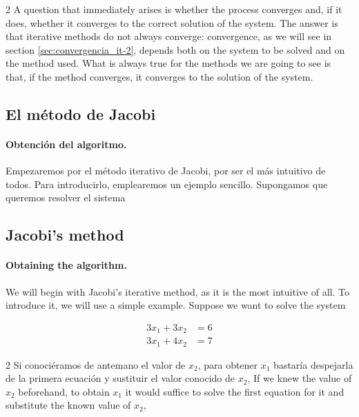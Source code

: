 \begin{paracol}{2}
A question that immediately arises is whether the process converges and, if it does, whether it converges to the correct solution of the system. The answer is that iterative methods do not always converge: convergence, as we will see in section \ref{sec:convergencia_it-2}, depends both on the system to be solved and on the method used. What is always true for the methods we are going to see is that, if the method converges, it converges to the solution of the system.

\switchcolumn
\subsection{El método de Jacobi} 

\paragraph{Obtención del algoritmo.} Empezaremos por el método iterativo de Jacobi, por ser el más intuitivo de todos. Para introducirlo, emplearemos un ejemplo sencillo. Supongamos que queremos resolver el sistema

\switchcolumn
\subsection{Jacobi's method} 

\paragraph{Obtaining the algorithm.} We will begin with Jacobi's iterative method, as it is the most intuitive of all. To introduce it, we will use a simple example. Suppose we want to solve the system
\end{paracol}

\begin{align*}
3x_1+3x_2&=6\\
3x_1+4x_2&=7
\end{align*}

\begin{paracol}{2}
Si conociéramos de antemano el valor de $x_2$, para obtener $x_1$ bastaría despejarla de la primera ecuación y sustituir el valor conocido de $x_2$,
\switchcolumn
If we knew the value of $x_2$ beforehand, to obtain $x_1$ it would suffice to solve the first equation for it and substitute the known value of $x_2$,
\end{paracol}

